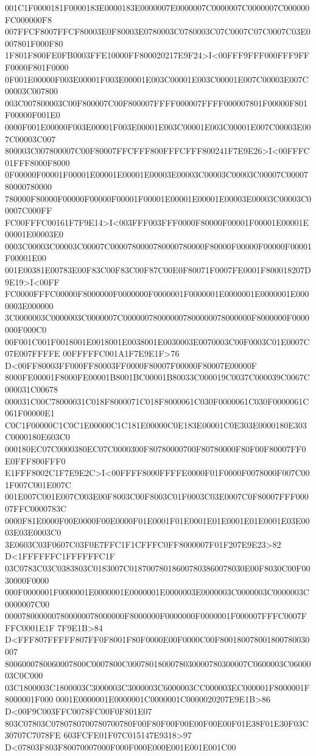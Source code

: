 001C1F0000181F0000183E0000183E0000007E0000007C0000007C0000007C000000FC000000F8
007FFCF8007FFCF80003E0F80003E0780003C0780003C07C0007C07C0007C03E0007801F000F80
1F801F800FE0FB0003FFE10000FF800020217E9F24>I<00FFF9FFF000FFF9FFF0000F801F0000
0F001E00000F003E00001F003E00001E003C00001E003C00001E007C00003E007C00003C007800
003C007800003C00F800007C00F800007FFFF000007FFFF000007801F00000F801F00000F001E0
0000F001E00000F003E00001F003E00001E003C00001E003C00001E007C00003E007C00003C007
800003C007800007C00F80007FFCFFF800FFFCFFF800241F7E9E26>I<00FFFC01FFF8000F8000
0F00000F00001F00001E00001E00001E00003E00003C00003C00003C00007C0000780000780000
780000F80000F00000F00000F00001F00001E00001E00001E00003E00003C00003C00007C000FF
FC00FFFC00161F7F9E14>I<003FFF003FFF0000F80000F00001F00001E00001E00001E00003E0
0003C00003C00003C00007C0000780000780000780000F80000F00000F00000F00001F00001E00
001E00381E00783E00F83C00F83C00F87C00E0F80071F0007FE0001F800018207D9E19>I<00FF
FC0000FFFC00000F8000000F0000000F0000001F0000001E0000001E0000001E0000003E000000
3C0000003C0000003C0000007C000000780000007800000078000000F8000000F0000000F000C0
00F001C001F0018001E0018001E0038001E0030003E0070003C00F0003C01E0007C07E007FFFFE
00FFFFFC001A1F7E9E1F>76 D<00FF80003FF000FF80003FF0000F80007F00000F80007E00000F
8000FE00001F8000FE00001B8001BC00001B80033C000019C0037C000039C0067C000031C00678
000031C00C78000031C018F8000071C018F8000061C030F0000061C030F0000061C061F00000E1
C0C1F00000C1C0C1E00000C1C181E00000C0E183E00001C0E303E0000180E303C0000180E603C0
000180EC07C0000380EC07C0000300F80780000700F80780000F80F00F80007FF0E0FFF800FFF0
E1FFF8002C1F7E9E2C>I<00FFFF8000FFFFE0000F01F0000F0078000F007C001F007C001E007C
001E007C001E007C003E00F8003C00F8003C01F0003C03E0007C0F80007FFF00007FFC0000783C
0000F81E0000F00E0000F00E0000F01E0001F01E0001E01E0001E01E0001E03E0003E03E0003C0
3E0603C03F0607C03F0E7FFC1F1CFFFC0FF8000007F01F207E9E23>82 D<1FFFFFFC1FFFFFFC1F
03C0783C03C0383803C0183007C018700780186007803860078030E00F8030C00F0030000F0000
000F0000001F0000001E0000001E0000001E0000003E0000003C0000003C0000003C0000007C00
0000780000007800000078000000F8000000F0000000F0000001F000007FFFC0007FFFC0001E1F
7F9E1B>84 D<FFF807FFFFF807FF0F8001F80F0000E00F0000C00F800180078001800780030007
8006000780060007800C0007800C0007801800078030000780300007C0600003C0600003C0C000
03C1800003C1800003C3000003C3000003C6000003CC000003EC000001F8000001F8000001F000
0001E0000001E0000001C0000001C0000020207E9E1B>86 D<00F9C003FFC0078FC00F0F801E07
803C07803C0780780700780700780F00F80F00F00E00F00E00F01E38F01E30F03C30707C7078FE
603FCFE01F07C015147E9318>97 D<07803F803F80070007000F000F000E000E001E001E001C00
